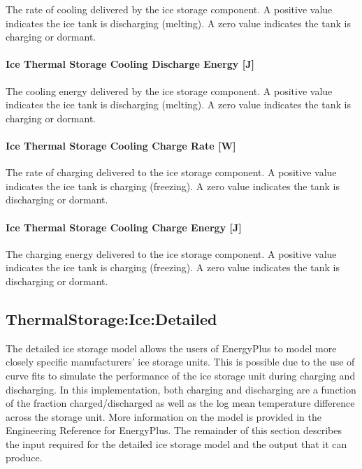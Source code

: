 The rate of cooling delivered by the ice storage component. A positive value indicates the ice tank is discharging (melting). A zero value indicates the tank is charging or dormant.

\paragraph{Ice Thermal Storage Cooling Discharge Energy {[}J{]}}\label{ice-thermal-storage-cooling-discharge-energy-j}

The cooling energy delivered by the ice storage component. A positive value indicates the ice tank is discharging (melting). A zero value indicates the tank is charging or dormant.

\paragraph{Ice Thermal Storage Cooling Charge Rate {[}W{]}}\label{ice-thermal-storage-cooling-charge-rate-w}

The rate of charging delivered to the ice storage component. A positive value indicates the ice tank is charging (freezing). A zero value indicates the tank is discharging or dormant.

\paragraph{Ice Thermal Storage Cooling Charge Energy {[}J{]}}\label{ice-thermal-storage-cooling-charge-energy-j}

The charging energy delivered to the ice storage component. A positive value indicates the ice tank is charging (freezing). A zero value indicates the tank is discharging or dormant.

\subsection{ThermalStorage:Ice:Detailed}\label{thermalstorageicedetailed}

The detailed ice storage model allows the users of EnergyPlus to model more closely specific manufacturers' ice storage units. This is possible due to the use of curve fits to simulate the performance of the ice storage unit during charging and discharging. In this implementation, both charging and discharging are a function of the fraction charged/discharged as well as the log mean temperature difference across the storage unit. More information on the model is provided in the Engineering Reference for EnergyPlus. The remainder of this section describes the input required for the detailed ice storage model and the output that it can produce.

